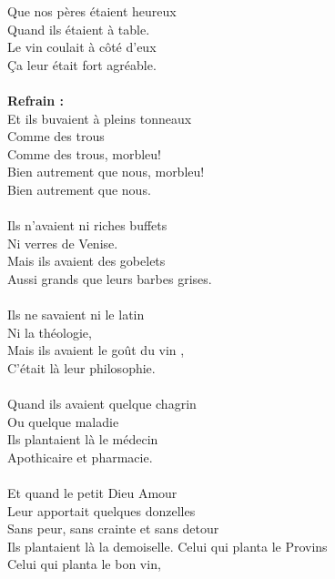 
 Que nos pères étaient heureux \bissimple
\\Quand ils étaient à table.
\\Le vin coulait à côté d'eux \bissimple
\\Ça leur était fort agréable.
\\\\\textbf{Refrain :}
\\Et ils buvaient à pleins tonneaux
\\Comme des trous
\\Comme des trous, morbleu!
\\Bien autrement que nous, morbleu!
\\Bien autrement que nous.
\\\\Ils n'avaient ni riches buffets \bissimple
\\Ni verres de Venise.
\\Mais ils avaient des gobelets \bissimple
\\Aussi grands que leurs barbes grises.
\\\\Ils ne savaient ni le latin \bissimple
\\Ni la théologie,
\\Mais ils avaient le goût du vin \bissimple,
\\C'était là leur philosophie.
\\\\Quand ils avaient quelque chagrin \bissimple
\\Ou quelque maladie
\\Ils plantaient là le médecin \bissimple
\\Apothicaire et pharmacie.
\\\\Et quand le petit Dieu Amour \bissimple
\\Leur apportait quelques donzelles
\\Sans peur, sans crainte et sans detour \bissimple
\\Ils plantaient là la demoiselle.
\breakpage
Celui qui planta le Provins %
\\Celui qui planta le bon vin,
